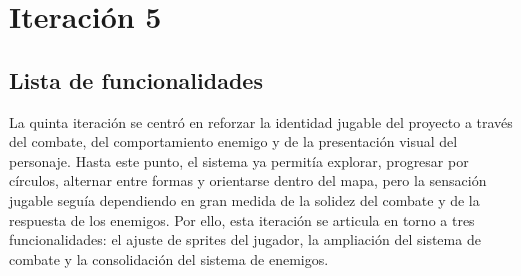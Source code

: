\chapter{Iteración 5}

\begin{abstract}
Esta iteración se centra en el núcleo jugable del combate. En ella se actualiza la
presentación visual del jugador y se incorporan los sistemas de combate y de enemigos que
permiten definir interacciones ofensivas, tipos de comportamiento y respuesta al daño.
\end{abstract}

\section{Lista de funcionalidades}
La quinta iteración se centró en reforzar la identidad jugable del proyecto a través del
combate, del comportamiento enemigo y de la presentación visual del personaje. Hasta este
punto, el sistema ya permitía explorar, progresar por círculos, alternar entre formas y
orientarse dentro del mapa, pero la sensación jugable seguía dependiendo en gran medida de
la solidez del combate y de la respuesta de los enemigos. Por ello, esta iteración se
articula en torno a tres funcionalidades: el ajuste de sprites del jugador, la ampliación
del sistema de combate y la consolidación del sistema de enemigos.

